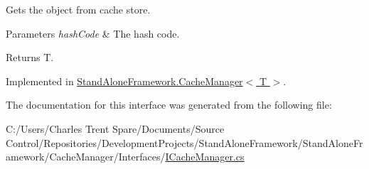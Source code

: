 Gets the object from cache store. 


\begin{DoxyParams}{Parameters}
{\em hash\+Code} & The hash code.\\
\hline
\end{DoxyParams}
\begin{DoxyReturn}{Returns}
T.
\end{DoxyReturn}


Implemented in \hyperlink{class_stand_alone_framework_1_1_cache_manager_3_01_t_01_4_a37a6e63d5523b967266e4abbc778de95}{Stand\+Alone\+Framework.\+Cache\+Manager$<$ T $>$}.



The documentation for this interface was generated from the following file\+:\begin{DoxyCompactItemize}
\item 
C\+:/\+Users/\+Charles Trent Spare/\+Documents/\+Source Control/\+Repositories/\+Development\+Projects/\+Stand\+Alone\+Framework/\+Stand\+Alone\+Framework/\+Cache\+Manager/\+Interfaces/\hyperlink{_i_cache_manager_8cs}{I\+Cache\+Manager.\+cs}\end{DoxyCompactItemize}
